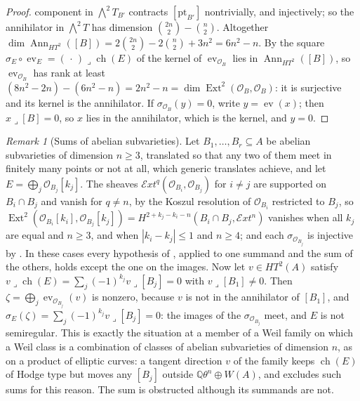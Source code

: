 \documentclass[11pt,reqno]{amsart}
\theoremstyle{plain}
\theoremstyle{definition}
\theoremstyle{remark}
\newtheorem{remark}[theorem]{Remark}
\newcommand{\QQ}{\mathbb{Q}}
\newcommand{\cO}{\mathcal{O}}
\newcommand{\HW}{W}                      %
\DeclareMathOperator{\ch}{ch}
\DeclareMathOperator{\Ext}{Ext}
\DeclareMathOperator{\Ann}{Ann}
\begin{document}
\begin{proof}
component in ${\textstyle\bigwedge^{2}}T_{B'}$ contracts $[\mathrm{pt}_{B'}]$
nontrivially, and injectively; so the annihilator in
${\textstyle\bigwedge^{2}}T$ has dimension $\binom{2n}{2}-\binom{n}{2}$.
Altogether $\dim\Ann_{HT^{2}}([B])=2\binom{2n}{2}-2\binom{n}{2}+3n^{2}
=6n^{2}-n$. By the square $\sigma_{E}\circ\operatorname{ev}_{E}=
(\,\cdot\,)\lrcorner\ch(E)$ of \cite[Setup~4.54]{paperII} the kernel of
$\operatorname{ev}_{\cO_{B}}$ lies in $\Ann_{HT^{2}}([B])$, so
$\operatorname{ev}_{\cO_{B}}$ has rank at least $(8n^{2}-2n)-(6n^{2}-n)
=2n^{2}-n=\dim\Ext^{2}(\cO_{B},\cO_{B})$: it is surjective and its kernel is
the annihilator. If $\sigma_{\cO_{B}}(y)=0$, write $y=\operatorname{ev}(x)$;
then $x\lrcorner[B]=0$, so $x$ lies in the annihilator, which is the kernel,
and $y=0$.
\end{proof}

\begin{remark}[Sums of abelian subvarieties]\label{rem:absums}
Let $B_{1},\dots,B_{r}\subseteq A$ be abelian subvarieties of dimension
$n\ge3$, translated so that any two of them meet in finitely many points or
not at all, which generic translates achieve, and let $E=\bigoplus_{j}
\cO_{B_{j}}[k_{j}]$. The sheaves $\mathcal{E}xt^{q}(\cO_{B_{i}},\cO_{B_{j}})$
for $i\ne j$ are supported on $B_{i}\cap B_{j}$ and vanish for $q\ne n$,
by the Koszul resolution of $\cO_{B_{i}}$ restricted to $B_{j}$, so
$\Ext^{2}(\cO_{B_{i}}[k_{i}],\cO_{B_{j}}[k_{j}])=H^{2+k_{j}-k_{i}-n}
(B_{i}\cap B_{j},\mathcal{E}xt^{n})$ vanishes when all $k_{j}$ are equal and
$n\ge3$, and when $|k_{i}-k_{j}|\le1$ and $n\ge4$; and each
$\sigma_{\cO_{B_{j}}}$ is injective by . In these cases
every hypothesis of , applied to one summand and the
sum of the others, holds except the one on the images. Now let $v\in HT^{2}(A)$
satisfy $v\lrcorner\ch(E)=\sum_{j}(-1)^{k_{j}}v\lrcorner[B_{j}]=0$ with
$v\lrcorner[B_{1}]\ne0$. Then $\zeta=\bigoplus_{j}\operatorname{ev}_{\cO_{B_{j}}}(v)$
is nonzero, because $v$ is not in the annihilator of $[B_{1}]$, and
$\sigma_{E}(\zeta)=\sum_{j}(-1)^{k_{j}}v\lrcorner[B_{j}]=0$: the images of
the $\sigma_{\cO_{B_{j}}}$ meet, and $E$ is not semiregular. This is exactly
the situation at a member of a Weil family on which a Weil class is a
combination of classes of abelian subvarieties of dimension $n$, as on a
product of elliptic curves: a tangent direction $v$ of the family keeps
$\ch(E)$ of Hodge type but moves any $[B_{j}]$ outside
$\QQ\theta^{n}\oplus\HW(A)$, and \cite[Corollary~3.17]{paperII} excludes such sums
for this reason. The sum is obstructed although its summands are not.
\end{remark}
\end{document}
